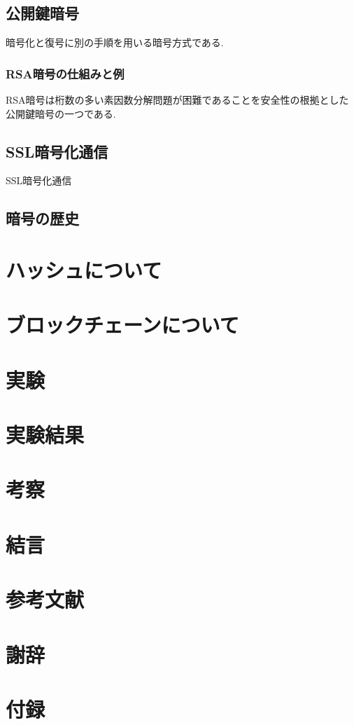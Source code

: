 \documentclass[a4j,12pt]{jsarticle}
\begin{document}
\subsection{公開鍵暗号}
暗号化と復号に別の手順を用いる暗号方式である.

\subsubsection{RSA暗号の仕組みと例}
RSA暗号は桁数の多い素因数分解問題が困難であることを安全性の根拠とした公開鍵暗号の一つである.

\subsection{SSL暗号化通信}
SSL暗号化通信



\subsection{暗号の歴史}







\section{ハッシュについて}

\section{ブロックチェーンについて}

\section{実験}


\section{実験結果}

\section{考察}

\section{結言}

\section{参考文献}

\section{謝辞}

\section{付録}
\end{document}
